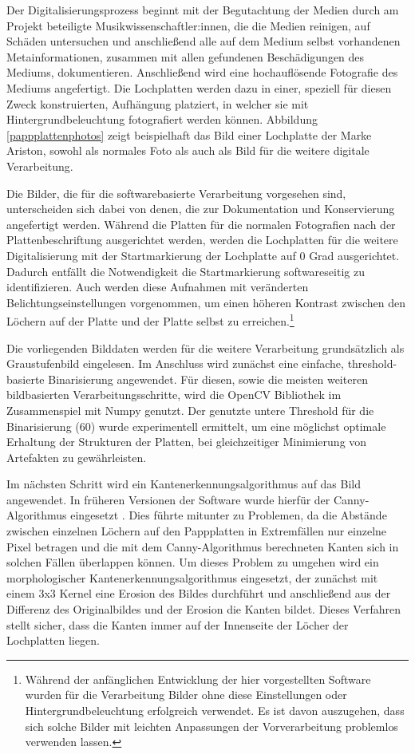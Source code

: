 Der Digitalisierungsprozess beginnt mit der Begutachtung der Medien durch am Projekt beteiligte Musikwissenschaftler:innen, die die Medien reinigen, auf Schäden untersuchen und anschließend alle auf dem Medium selbst vorhandenen Metainformationen, zusammen mit allen gefundenen Beschädigungen des Mediums, dokumentieren.
Anschließend wird eine hochauflösende Fotografie des Mediums angefertigt.
Die Lochplatten werden dazu in einer, speziell für diesen Zweck konstruierten, Aufhängung platziert, in welcher sie mit Hintergrundbeleuchtung fotografiert werden können.
Abbildung \ref{pappplattenphotos} zeigt beispielhaft das Bild einer Lochplatte der Marke Ariston, sowohl als normales Foto als auch als Bild für die weitere digitale Verarbeitung.

Die Bilder, die für die softwarebasierte Verarbeitung vorgesehen sind, unterscheiden sich dabei von denen, die zur Dokumentation und Konservierung angefertigt werden.
Während die Platten für die normalen Fotografien nach der Plattenbeschriftung ausgerichtet werden, werden die Lochplatten für die weitere Digitalisierung mit der Startmarkierung der Lochplatte auf 0 Grad ausgerichtet.
Dadurch entfällt die Notwendigkeit die Startmarkierung softwareseitig zu identifizieren.
Auch werden diese Aufnahmen mit veränderten Belichtungseinstellungen vorgenommen, um einen höheren Kontrast zwischen den Löchern auf der Platte und der Platte selbst zu erreichen.\footnote{Während der anfänglichen Entwicklung der hier vorgestellten Software wurden für die Verarbeitung Bilder ohne diese Einstellungen oder Hintergrundbeleuchtung erfolgreich verwendet. Es ist davon auszugehen, dass sich solche Bilder mit leichten Anpassungen der Vorverarbeitung problemlos verwenden lassen.}

Die vorliegenden Bilddaten werden für die weitere Verarbeitung grundsätzlich als Graustufenbild eingelesen.
Im Anschluss wird zunächst eine einfache, threshold-basierte Binarisierung angewendet.
Für diesen, sowie die meisten weiteren bildbasierten Verarbeitungsschritte, wird die OpenCV \parencite[]{opencv_library} Bibliothek im Zusammenspiel mit Numpy \parencite[]{harris2020array} genutzt.
Der genutzte untere Threshold für die Binarisierung (60) wurde experimentell ermittelt, um eine möglichst optimale Erhaltung der Strukturen der Platten, bei gleichzeitiger Minimierung von Artefakten zu gewährleisten.

Im nächsten Schritt wird ein Kantenerkennungsalgorithmus auf das Bild angewendet.
In früheren Versionen der Software wurde hierfür der Canny-Algorithmus eingesetzt \parencite[]{canny_1986}.
Dies führte mitunter zu Problemen, da die Abstände zwischen einzelnen Löchern auf den Pappplatten in Extremfällen nur einzelne Pixel betragen und die mit dem Canny-Algorithmus berechneten Kanten sich in solchen Fällen überlappen können.
Um dieses Problem zu umgehen wird ein morphologischer Kantenerkennungsalgorithmus eingesetzt, der zunächst mit einem 3x3 Kernel eine Erosion des Bildes durchführt und anschließend aus der Differenz des Originalbildes und der Erosion die Kanten bildet.
Dieses Verfahren stellt sicher, dass die Kanten immer auf der Innenseite der Löcher der Lochplatten liegen.

